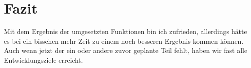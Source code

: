 \chapter{Fazit}

Mit dem Ergebnis der umgesetzten Funktionen bin ich zufrieden, allerdings hätte es bei ein bisschen mehr Zeit zu einem noch besseren Ergebnis kommen können. Auch wenn jetzt der ein oder andere zuvor geplante Teil fehlt, haben wir fast alle Entwicklungsziele erreicht.